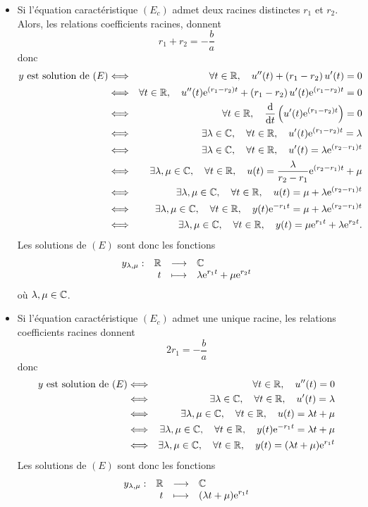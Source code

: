 \documentclass{magnolia}
\begin{document}
\begin{preuve}
\begin{francois}
\begin{itemize}
\item Si l'équation caractéristique $(E_c)$ admet deux racines distinctes $r_1$ et $r_2$. Alors, les relations coefficients racines, donnent
\[r_1+r_2=-\frac{b}{a}\]
donc
\begin{eqnarray*}
\text{$y$ est solution de $(E)$}
&\Longleftrightarrow& \forall t\in \mathbb{R},\quad u''(t)+\left(r_1-r_2\right)u'(t)=0\\
&\Longleftrightarrow& \forall t\in \mathbb{R},\quad u''(t){\rm e}^{(r_1-r_2)t}+\left(r_1-r_2\right)u'(t){\rm e}^{(r_1-r_2)t}=0\\
&\Longleftrightarrow& \forall t\in\mathbb{R},\quad \frac{{\rm d}}{{\rm d}t}\left(u'(t){\rm e}^{(r_1-r_2)t}\right)=0\\
&\Longleftrightarrow& \exists\lambda\in\mathbb{C},\quad \forall t\in\mathbb{R},\quad u'(t){\rm e}^{(r_1-r_2)t}=\lambda\\
&\Longleftrightarrow& \exists\lambda\in\mathbb{C},\quad \forall t\in\mathbb{R},\quad u'(t)=\lambda {\rm e}^{(r_2-r_1)t}\\
&\Longleftrightarrow& \exists\lambda,\mu\in\mathbb{C},\quad \forall t\in\mathbb{R},\quad u(t)=\frac{\lambda}{r_2-r_1} {\rm e}^{(r_2-r_1)t}+\mu\\
&\Longleftrightarrow& \exists\lambda,\mu\in\mathbb{C},\quad \forall t\in\mathbb{R},\quad u(t)=\mu+\lambda {\rm e}^{(r_2-r_1)t}\\
&\Longleftrightarrow& \exists\lambda,\mu\in\mathbb{C},\quad \forall t\in\mathbb{R},\quad y(t){\rm e}^{-r_1 t}=\mu+\lambda {\rm e}^{(r_2-r_1)t}\\
&\Longleftrightarrow& \exists\lambda,\mu\in\mathbb{C},\quad \forall t\in\mathbb{R},\quad y(t)=\mu {\rm e}^{r_1 t}+\lambda {\rm e}^{r_2 t }.
\end{eqnarray*}
Les solutions de $(E)$ sont donc les fonctions
\[\begin{array}[t]{lrcl} \displaystyle{y_{\lambda,\mu}} : & \displaystyle{\mathbb{R}} & \longrightarrow & \displaystyle{\mathbb{C}} \\ & \displaystyle{t} & \longmapsto & \displaystyle{\lambda {\rm e}^{r_1 t}+\mu {\rm e}^{r_2 t}} \end{array}\]
où $\lambda,\mu\in\mathbb{C}$.
\item Si l'équation caractéristique $(E_c)$ admet une unique racine, les relations coefficients racines donnent
\[2r_1=-\frac{b}{a}\]
donc
\begin{eqnarray*}
\text{$y$ est solution de $(E)$}
&\Longleftrightarrow& \forall t\in \mathbb{R},\quad u''(t)=0\\
&\Longleftrightarrow& \exists\lambda\in\mathbb{C},\quad \forall t\in \mathbb{R},\quad u'(t)=\lambda\\
&\Longleftrightarrow& \exists\lambda,\mu\in\mathbb{C},\quad \forall t\in \mathbb{R},\quad u(t)=\lambda t+\mu\\
&\Longleftrightarrow& \exists\lambda,\mu\in\mathbb{C},\quad \forall t\in\mathbb{R},\quad y(t){\rm e}^{-r_1 t}=\lambda t+\mu\\
&\Longleftrightarrow& \exists\lambda,\mu\in\mathbb{C},\quad \forall t\in\mathbb{R},\quad y(t)=(\lambda t+\mu) {\rm e}^{r_1 t}
\end{eqnarray*}
Les solutions de $(E)$ sont donc les fonctions
\[\begin{array}[t]{lrcl} \displaystyle{y_{\lambda,\mu}} : & \displaystyle{\mathbb{R}} & \longrightarrow & \displaystyle{\mathbb{C}} \\ & \displaystyle{t} & \longmapsto & \displaystyle{(\lambda t+\mu){\rm e}^{r_1 t}} \end{array}\]

\end{itemize}
\end{francois}
\end{preuve}
\end{document}
